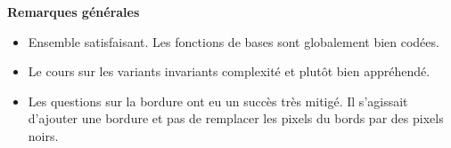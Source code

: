 \documentclass[10pt,fleqn]{book} %
\begin{document}

\pagestyle{fancy}
\thispagestyle{plain}


\def\columnseprulecolor{\color{ocre}}
\setlength{\columnseprule}{0pt} 



\vspace{6cm}
%

\textbf{Remarques générales}
\begin{itemize}
\item Ensemble satisfaisant. Les fonctions de bases sont globalement bien codées. \hfill {}
\item Le cours sur les variants invariants complexité et plutôt bien appréhendé. \hfill {}
\item Les questions sur la bordure ont eu un succès très mitigé. Il s'agissait d'ajouter une bordure et pas de remplacer les pixels du bords par des pixels noirs. \hfill {}
\end{itemize}




\newpage

\end{document}
